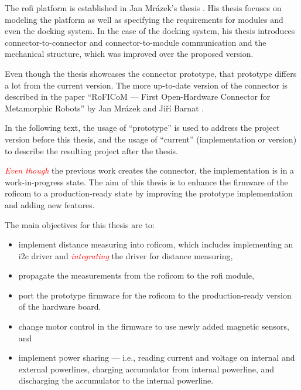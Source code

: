 \documentclass[
  digital,     %
  oneside,     %
  nosansbold,  %
  nocolorbold, %
  nolof,         %
  nolot,         %
]{fithesis4}
\newcommand{\TODO}[1]{\textcolor{red}{\textit{#1}}}
\begin{document}
The \acrshort{rofi} platform is established in Jan Mrázek's thesis \cite{Mrazek2019thesis}. His thesis focuses on modeling the platform as well as specifying the requirements for modules and even the docking system. In the case of the docking system, his thesis introduces connector-to-connector and connector-to-module communication and the mechanical structure, which was improved over the proposed version.

Even though the thesis showcases the connector prototype, that prototype differs a lot from the current version. The more up-to-date version of the connector is described in the paper ``RoFICoM --- First Open-Hardware Connector for Metamorphic Robots'' by Jan Mrázek and Jiří Barnat \cite{MrazekBarnat2019Roficom}.

In the following text, the usage of ``prototype'' is used to address the project version before this thesis, and the usage of ``current'' (implementation or version) to describe the resulting project after the thesis.

\TODO{Even though} the previous work creates the connector, the implementation is in a work-in-progress state. The aim of this thesis is to enhance the firmware of the \acrshort{roficom} to a production-ready state by improving the prototype implementation and adding new features.

The main objectives for this thesis are to:
\begin{itemize}
    \item implement distance measuring into \acrshort{roficom}, which includes implementing an \acrshort{i2c} driver and \TODO{integrating} the driver for distance measuring,
    \item propagate the measurements from the \acrshort{roficom} to the \acrshort{rofi} module, 
    \item port the prototype firmware for the \acrshort{roficom} to the production-ready version of the hardware board.
    \item change motor control in the firmware to use newly added magnetic sensors, and
    \item implement power sharing --- i.e., reading current and voltage on internal and external powerlines, charging accumulator from internal powerline, and discharging the accumulator to the internal powerline.
\end{itemize}
\end{document}
